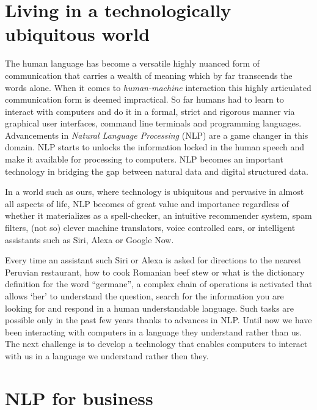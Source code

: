 \section{Living in a technologically ubiquitous world}
\label{sec:motivation}
The human language has become a versatile highly nuanced form of communication that carries a wealth of meaning which by far transcends the words alone. When it comes to \textit{human-machine} interaction this highly articulated communication form is deemed impractical. So far humans had to learn to interact with computers and do it in a formal, strict and rigorous manner via graphical user interfaces, command line terminals and programming languages. Advancements in \textit{Natural Language Processing} (NLP) are a game changer in this domain. NLP starts to unlocks the information locked in the human speech and make it available for processing to computers. NLP becomes an important technology in bridging the gap between natural data and digital structured data.

In a world such as ours, where technology is ubiquitous and pervasive in almost all aspects of life, NLP becomes of great value and importance regardless of whether it materializes as a spell-checker, an intuitive recommender system, spam filters, (not so) clever machine translators, voice controlled cars, or intelligent assistants such as Siri, Alexa or Google Now. 

Every time an assistant such Siri or Alexa is asked for directions to the nearest Peruvian restaurant, how to cook Romanian beef stew or what is the dictionary definition for the word ``germane'', a complex chain of operations is activated that allows `her' to understand the question, search for the information you are looking for and respond in a human understandable language. Such tasks are possible only in the past few years thanks to advances in NLP. Until now we have been interacting with computers in a language they understand rather than us. The next challenge is to develop a technology that enables computers to interact with us in a language we understand rather then they. %

\section{NLP for business}
\label{sec:motivation-business}

